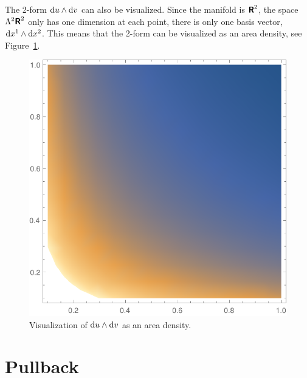 \documentclass[11pt, english, fleqn, DIV=15, headinclude, BCOR=1cm]{scrartcl}
\begin{document}
The 2-form $\mathop{}\!\mathrm d u \wedge \mathop{}\!\mathrm d v$ can also be visualized. Since the manifold is
$\text{\bfseries\sffamily R}^2$, the space $\Lambda^2 \text{\bfseries\sffamily R}^2$ only has one dimension at each point, there
is only one basis vector, $\mathop{}\!\mathrm d x^1 \wedge \mathop{}\!\mathrm d x^2$. This means that the
2-form can be visualized as an area density, see Figure~\ref{fig:density}.

\begin{figure}[htbp]
    \centering
    \includegraphics[width=.45\linewidth]{density_uv.pdf}
    \caption{%
        Visualization of $\mathop{}\!\mathrm d u \wedge \mathop{}\!\mathrm d v$ as an area density.
    }
    \label{fig:density}
\end{figure}

\section{Pullback}
\label{homework:4}
\end{document}
